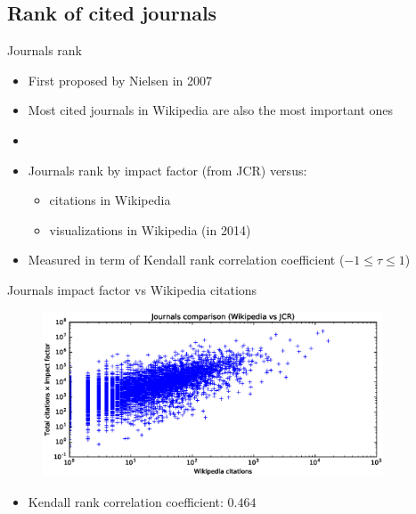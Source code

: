 \documentclass{beamer}
\begin{document}
\subsection{Rank of cited journals}
\begin{frame}{Journals rank}
    \begin{itemize}
        \item First proposed by Nielsen in 2007~\cite{Nielsen2007}
        \item Most cited journals in Wikipedia are also the most important ones
        \item[]
        \item Journals rank by impact factor (from JCR) versus:
        \begin{itemize}
            \item citations in Wikipedia
            \item visualizations in Wikipedia (in 2014)
        \end{itemize}
        \item Measured in term of Kendall rank correlation coefficient ($-1 \le \tau \le 1$)
    \end{itemize}
\end{frame}

\begin{frame}{Journals impact factor vs Wikipedia citations}
    \begin{figure}
    \centering
    \includegraphics[width=0.9\textwidth]{assets/journals_compare_appearances}
    \end{figure}

    \begin{itemize}
        \item Kendall rank correlation coefficient: $0.464$
    \end{itemize}
\end{frame}
\end{document}
